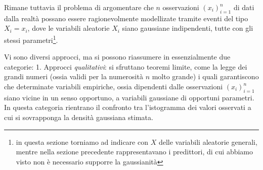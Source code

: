\documentclass[
  italian,
  letterpaper,
]{book}
\theoremstyle{definition}
\theoremstyle{remark}
\begin{document}
Rimane tuttavia il problema di argomentare che \(n\) osservazioni
\((x_i)_{i=1}^n\) di dati dalla realtà possano essere ragionevolmente
modellizate tramite eventi del tipo \(X_i =x_i\), dove le variabili
aleatorie \(X_i\) siano gaussiane indipendenti, tutte con gli stessi
parametri\footnote{in questa sezione torniamo ad indicare con \(X\)
  delle variabili aleatorie generali, mentre nella sezione precedente
  rappresentavano i predittori, di cui abbiamo visto non è necessario
  supporre la gaussianità}.

Vi sono diversi approcci, ma si possono riassumere in essenzialmente due
categorie: 1. Approcci \emph{qualitativi}: si sfruttano teoremi limite,
come la legge dei grandi numeri (ossia validi per la numerosità \(n\)
molto grande) i quali garantiscono che determinate variabili empiriche,
ossia dipendenti dalle osservazioni \((x_i)_{i=1}^n\) siano vicine in un
senso opportuno, a variabili gaussiane di opportuni parametri. In questa
categoria rientrano il confronto tra l'istogramma dei valori osservati a
cui si sovrapponga la densità gaussiana stimata.
\end{document}
